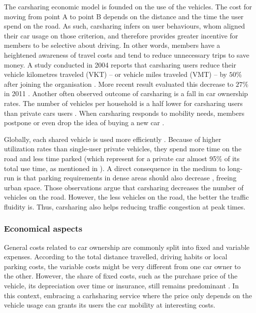 \begin{bibunit}[ieeetr]
The carsharing economic model is founded on the use of the vehicles.
The cost for moving from point A to point B depends on the distance and the time the user spend on the road.
As such, carsharing infers on user behaviours, whom aligned their car usage on those criterion, and therefore provides greater incentive for members to be selective about driving.
In other words, members have a heightened awareness of travel costs and tend to reduce unnecessary trips to save money.
A study conducted in 2004 reports that carsharing users reduce their vehicle kilometres traveled (VKT) -- or vehicle miles traveled (VMT) -- by $50$\% after joining the organisation \cite{cervero_city_2004}.
More recent result evaluated this decrease to $27$\% in 2011 \cite{martin_greenhouse_2011}.
Another often observed outcome of carsharing is a fall in car ownership rates.
The number of vehicles per household is a half lower for carsharing users than private cars users \cite{martin_impact_2010, ter_schure_cumulative_2012}.
When carsharing responds to mobility needs, members postpone or even drop the idea of buying a new car \cite{martin_impact_2010, sioui_carsharing_2013}.

\medskip
Globally, each shared vehicle is used more efficiently \cite{litman_evaluating_2000, schuster_assessing_2005}.
Because of higher utilization rates than single-user private vehicles, they spend more time on the road and less time parked (which represent for a private car almost 95\% of its total use time, as mentioned in \cite{transflash_2013}).
A direct consequence in the medium to long-run is that parking requirements in dense areas should also decrease \cite{mitchell_reinventing_2010}, freeing urban space.
Those observations argue that carsharing decreases the number of vehicles on the road.
However, the less vehicles on the road, the better the traffic fluidity is.
Thus, carsharing also helps reducing traffic congestion at peak times.


\subsubsection{Economical aspects}
General costs related to car ownership are commonly split into fixed and variable expenses.
According to the total distance travelled, driving habits or local parking costs, the variable costs might be very different from one car owner to the other.
However, the share of fixed costs, such as the purchase price of the vehicle, its depreciation over time or insurance, still remains predominant \cite{cout_reel_auto}.
In this context, embracing a carhsharing service where the price only depends on the vehicle usage can grants its users the car mobility at interesting costs.


\end{bibunit}
